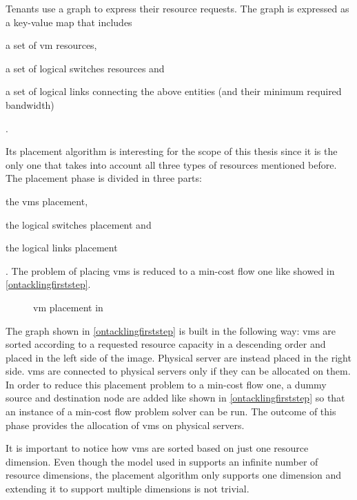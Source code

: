 Tenants use a graph to express their resource requests.
The graph is expressed as a key-value map that includes
\begin{mylist}
    \item a set of \gls{vm} resources,
    \item a set of logical switches resources and
    \item a set of logical links connecting the above entities (and their minimum required bandwidth)
\end{mylist}.

Its placement algorithm is interesting for the scope of this thesis since it is the only one that takes into account all three types of resources mentioned before.
The placement phase is divided in three parts:
\begin{mylist}
    \item the \glspl{vm} placement,
    \item the logical switches placement and
    \item the logical links placement
\end{mylist}.
The problem of placing \glspl{vm} is reduced to a min-cost flow one like showed in \autoref{ontacklingfirststep}.

\begin{figure}[!htb]
    \centering
    \usebox{\ontacklingfirststep}
    \caption{\gls{vm} placement in \cite{ontackling}}
    \label{ontacklingfirststep}
\end{figure}

The graph shown in \autoref{ontacklingfirststep} is built in the following way: \glspl{vm} are sorted according to a requested resource capacity in a descending order and placed in the left side of the image.
Physical server are instead placed in the right side.
\glspl{vm} are connected to physical servers only if they can be allocated on them.
In order to reduce this placement problem to a min-cost flow one, a dummy source and destination node are added like shown in \autoref{ontacklingfirststep} so that an instance of a min-cost flow problem solver can be run.
The outcome of this phase provides the allocation of \glspl{vm} on physical servers.

It is important to notice how \glspl{vm} are sorted based on just one resource dimension.
Even though the model used in \cite{ontackling} supports an infinite number of resource dimensions, the placement algorithm only supports one dimension and extending it to support multiple dimensions is not trivial.

